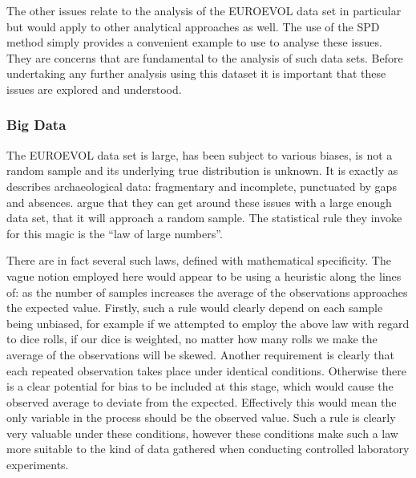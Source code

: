 The other issues relate to the analysis of the EUROEVOL data set in particular but would apply to other analytical approaches as well. The use of the SPD method simply provides a convenient example to use to analyse these issues. They are concerns that are fundamental to the analysis of such data sets. Before undertaking any further analysis using this dataset it is important that these issues are explored and understood.

\subsubsection{Big Data}
The EUROEVOL data set is large, has been subject to various biases, is not a random sample and its underlying true distribution is unknown. It is exactly as \citet{doi:10.1177/0162243916671200} describes archaeological data: fragmentary and incomplete, punctuated by gaps and absences. \citet{Timpson2015199} argue that they can get around these issues with a large enough data set, that it will approach a random sample. The statistical rule they invoke for this magic is the ``law of large numbers''.

There are in fact several such laws, defined with mathematical specificity. The vague notion employed here would appear to be using a heuristic along the lines of: as the number of samples increases the average of the observations approaches the expected value. Firstly, such a rule would clearly depend on each sample being unbiased, for example if we attempted to employ the above law with regard to dice rolls, if our dice is weighted, no matter how many rolls we make the average of the observations will be skewed. Another requirement is clearly that each repeated observation takes place under identical conditions. Otherwise there is a clear potential for bias to be included at this stage, which would cause the observed average to deviate from the expected. Effectively this would mean the only variable in the process should be the observed value. Such a rule is clearly very valuable under these conditions, however these conditions make such a law more suitable to the kind of data gathered when conducting controlled laboratory experiments. 

